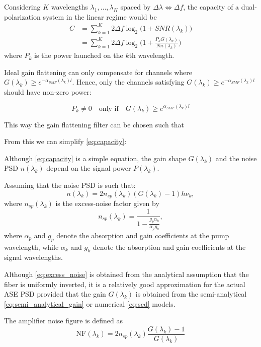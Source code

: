 \documentclass[a4paper]{article}
\begin{document}
Considering $K$ wavelengths $\lambda_1, \ldots, \lambda_{K}$ spaced by $\Delta\lambda\Longleftrightarrow\Delta f$, the capacity of a dual-polarization system in the linear regime would be
\begin{align}
	C &= \sum_{k = 1}^{K} 2\Delta f\log_2\Big(1 + SNR(\lambda_k)\Big)\\
	&= \sum_{k = 1}^{K} 2\Delta f\log_2\Bigg(1 + \frac{P_kG(\lambda_k)}{Nn(\lambda_k)}\Bigg)\label{eq:capacity}
\end{align}
where $P_k$ is the power launched on the $k$th wavelength. 

Ideal gain flattening can only compensate for channels where $G(\lambda_k) \geq e^{-\alpha_{SMF}(\lambda_k)l}$. Hence, only the channels satisfying $G(\lambda_k) \geq e^{-\alpha_{SMF}(\lambda_k)l}$ should have non-zero power:

\begin{equation}
P_k \neq 0 \quad\text{only if}\quad G(\lambda_k) \geq e^{\alpha_{SMF}(\lambda_k)l}
\end{equation}

This way the gain flattening filter can be chosen such that

From this we can simplify \eqref{eq:capacity}:

Although \eqref{eq:capacity} is a simple equation, the gain shape $G(\lambda_k)$ and the noise PSD $n(\lambda_k)$ depend on the signal power $P(\lambda_k)$.

Assuming that the noise PSD is such that:
\begin{equation}
	n(\lambda_k) = 2n_{sp}(\lambda_k)(G(\lambda_k) - 1)h\nu_k,
\end{equation}
where $n_{sp}(\lambda_k)$ is the excess-noise factor given by
\begin{equation} \label{eq:excess_noise}
	n_{sp}(\lambda_k) = \frac{1}{1 - \frac{g_p\alpha_k}{\alpha_pg_k}},
\end{equation}
where $\alpha_p$ and $g_p$ denote the absorption and gain coefficients at the pump wavelength, while  $\alpha_k$ and $g_k$ denote the absorption and gain coefficients at the signal wavelengths. 

Although \eqref{eq:excess_noise} is obtained from the analytical assumption that the fiber is uniformly inverted, it is a relatively good approximation for the actual ASE PSD provided that the gain $G(\lambda_k)$ is obtained from the semi-analytical \eqref{eq:semi_analytical_gain} or numerical \eqref{eq:scd} models. 

The amplifier noise figure is defined as
\begin{equation} \label{eq:NF}
	\mathrm{NF}(\lambda_k) = 2n_{sp}(\lambda_k)\frac{G(\lambda_k)-1}{G(\lambda_k)}
\end{equation}
\end{document}
